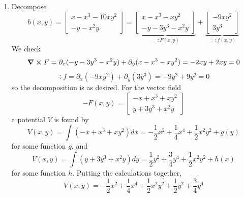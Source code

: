 \documentclass{article}
\newcommand{\m}[2][b]{\begin{#1matrix}#2\end{#1matrix}}
\newcommand{\ptl}{\partial}
\begin{document}
\begin{enumerate}
\begin{enumerate}
	
	\item Decompose
	$$b(x,y) = \m{x-x^3-10xy^2 \\ -y-x^2y}
	= \underbrace{\m{x-x^3-xy^2 \\ -y-3y^3-x^2y}}_{=:F(x,y)} + \underbrace{\m{-9xy^2 \\ 3y^3}}_{=:f(x,y)}$$
	We check
	$$\curl F = \ptl_x(-y-3y^3-x^2y) + \ptl_y(x-x^3-xy^2) = -2xy + 2xy = 0$$
	$$\div f = \ptl_x(-9xy^2) + \ptl_y(3y^3) = -9y^2 + 9y^2 = 0$$
	so the decomposition is as desired. For the vector field
	$$-F(x,y) = \m{-x+x^3+xy^2 \\ y+3y^3+x^2y}$$
	a potential $V$ is found by
	$$V(x,y) = \int (-x+x^3+xy^2)dx = -\frac12x^2 + \frac14x^4 + \frac12x^2y^2 + g(y)$$
	for some function $g$, and
	$$V(x,y) = \int (y+3y^3+x^2y)dy = \frac12y^2 + \frac34y^4 + \frac12x^2y^2 + h(x)$$
	for some function $h$. Putting the calculations together,
	$$V(x,y) = -\frac12x^2 + \frac14x^4 + \frac12x^2y^2 + \frac12y^2 + \frac34y^4$$

 
\end{enumerate}



\end{enumerate}

	
\end{document}
